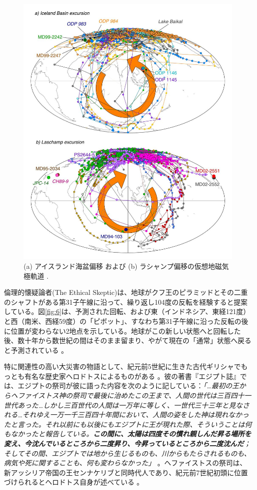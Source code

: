 \documentclass[10pt,twocolumn,letterpaper]{article}
\begin{document}
\begin{figure}[t]
\begin{center}
   \includegraphics[width=0.95\linewidth]{laj.jpg}
\end{center}
   \caption{(a) アイスランド海盆偏移 および (b) ラシャンプ偏移の仮想地磁気極軌道 \cite{35}.}
\label{fig:7}
\label{fig:onecol}
\end{figure}

倫理的懐疑論者(The Ethical Skeptic)は、地球がクフ王のピラミッドとその二重のシャフトがある第31子午線に沿って、繰り返し104度の反転を経験すると提案している。図\ref{fig:6}は、予測された回転、および東（インドネシア、東経121度）と西（南米、西経59度）の「ピボット」、すなわち第31子午線に沿った反転の後に位置が変わらない2地点を示している。地球がこの新しい状態へと回転した後、数十年から数世紀の間はそのまま留まり、やがて現在の「通常」状態へ戻ると予測されている \cite{150}。

特に関連性の高い大災害の物語として、紀元前5世紀に生きた古代ギリシャでもっとも有名な歴史家ヘロドトスによるものがある \cite{31}。彼の著書『エジプト誌』では、エジプトの祭司が彼に語った内容を次のように記している：\textit{「…最初の王からヘファイストス神の祭司で最後に治めたこの王まで、人間の世代は三百四十一世代あった…しかし三百世代の人間は一万年に等しく、一世代三十三年と見なされる…それゆえ一万一千三百四十年間において、人間の姿をした神は現れなかったと言った。それ以前にも以後にもエジプトに王が現れた際、そういうことは何もなかったと報告している。\textbf{この間に、太陽は四度その慣れ親しんだ昇る場所を変え、今沈んでいるところから二度昇り、今昇っているところから二度沈んだ}；そしてその間、エジプトでは地から生じるものも、川からもたらされるものも、病気や死に関することも、何も変わらなかった」} \cite{32}。ヘファイストスの祭司は、新アッシリア帝国の王センナケリブと同時代人であり、紀元前7世紀初頭に位置づけられるとヘロドトス自身が述べている \cite{32,33,34}。
\end{document}
